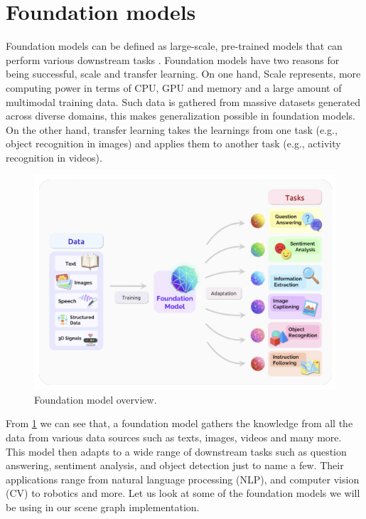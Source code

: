 \section{Foundation models}
Foundation models can be defined as large-scale, pre-trained models that can perform various downstream tasks \cite{bommasani2022opportunitiesrisksfoundationmodels}. 
Foundation models have two reasons for being successful, scale and transfer learning. On one hand, Scale represents,
more computing power in terms of CPU, GPU and memory and a large amount of multimodal training data. Such data is gathered from 
massive datasets generated across diverse domains, this makes generalization possible in foundation models. On the other hand, transfer
learning takes the learnings from one task (e.g., object recognition in images) and
applies them to another task (e.g., activity recognition in videos). 
\begin{figure}[ht!]
    \centering
    \includegraphics[width=\textwidth]{images/FoundationModels.png}
    \caption{Foundation model overview.}
    \label{fig:foundation_model}
\end{figure}
From \cref{fig:foundation_model} we can see that, 
a foundation model gathers the knowledge from all the data from various data sources such as texts, images, videos and many more.
This model then adapts to a wide range of downstream tasks such as question answering, sentiment analysis, and object detection just to 
name a few. Their applications range from natural language processing (NLP), and computer vision (CV) to robotics and more. 
Let us look at some of the foundation models we will be using in our scene graph implementation.

